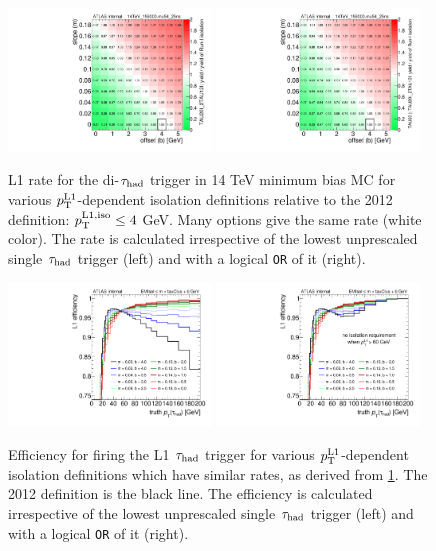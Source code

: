 \begin{figure}[tp]
  \centering
  \includegraphics[width=0.48\textwidth]{figures/trigger/iso_background_noTAU60}
  \includegraphics[width=0.48\textwidth]{figures/trigger/iso_background_yesTAU60}
  \caption{L1 rate for the di-$\tau_\text{had}$ trigger in 14 TeV minimum bias MC for various $p_{\mathrm{T}}^\text{L1}$-dependent isolation definitions relative to the 2012 definition: $p_{\mathrm{T}}^\text{L1,iso} \leq 4$ GeV. Many options give the same rate (white color). The rate is calculated irrespective of the lowest unprescaled single $\tau_\text{had}$ trigger (left) and with a logical \texttt{OR} of it (right).}
  \label{fig:prospects-trigger-isolation-rate}
\end{figure}

\begin{figure}[tp]
  \centering
  \includegraphics[width=0.48\textwidth]{figures/trigger/iso_turnonL1_noTAU60}
  \includegraphics[width=0.48\textwidth]{figures/trigger/iso_turnonL1_yesTAU60}
  \caption{Efficiency for firing the L1 $\tau_\text{had}$ trigger for various $p_{\mathrm{T}}^\text{L1}$-dependent isolation definitions which have similar rates, as derived from \cref{fig:prospects-trigger-isolation-rate}. The 2012 definition is the black line. The efficiency is calculated irrespective of the lowest unprescaled single $\tau_\text{had}$ trigger (left) and with a logical \texttt{OR} of it (right).}
  \label{fig:prospects-trigger-isolation-turnon}
\end{figure}

